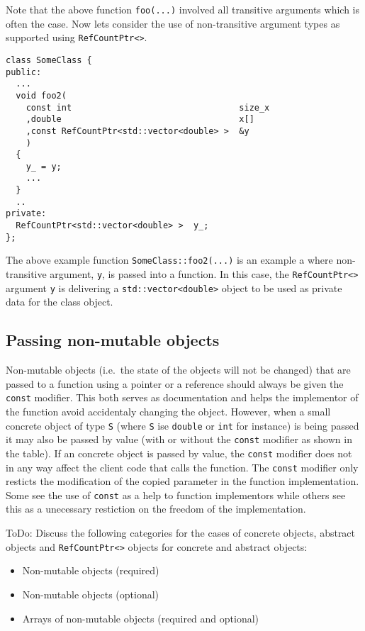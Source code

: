 Note that the above function {}\texttt{foo(...)} involved all
transitive arguments which is often the case.  Now lets consider the
use of non-transitive argument types as supported using
{}\texttt{Ref\-Count\-Ptr<>}.
%
{\scriptsize\begin{verbatim}
class SomeClass {
public:
  ...
  void foo2(
    const int                                 size_x
    ,double                                   x[]
    ,const RefCountPtr<std::vector<double> >  &y
    )
  {
    y_ = y;
    ...
  }
  ..
private:
  RefCountPtr<std::vector<double> >  y_;
};
\end{verbatim}}
%
{}\noindent{}The above example function
{}\texttt{SomeClass\-::foo2(...)} is an example a where non-transitive
argument, {}\texttt{y}, is passed into a function.  In this case, the
{}\texttt{Ref\-Count\-Ptr<>} argument {}\texttt{y} is delivering a
{}\texttt{std\-::vector<\-double>} object to be used as private data
for the class object.

%
\subsection{Passing non-mutable objects}
%

Non-mutable objects (i.e.~the state of the objects will not be
changed) that are passed to a function using a pointer or a reference
should always be given the {}\texttt{const} modifier.  This both
serves as documentation and helps the implementor of the function
avoid accidentaly changing the object.  However, when a small concrete
object of type {}\texttt{S} (where {}\texttt{S} ise {}\texttt{double}
or {}\texttt{int} for instance) is being passed it may also be passed
by value (with or without the {}\texttt{const} modifier as shown in
the table).  If an concrete object is passed by value, the
{}\texttt{const} modifier does not in any way affect the client code
that calls the function.  The {}\texttt{const} modifier only resticts
the modification of the copied parameter in the function
implementation.  Some see the use of {}\texttt{const} as a help to
function implementors while others see this as a unecessary restiction
on the freedom of the implementation.

ToDo: Discuss the following categories for the cases of concrete
objects, abstract objects and {}\texttt{Ref\-Count\-Ptr<>} objects for
concrete and abstract objects:

\begin{itemize}
\item Non-mutable objects (required)
\item Non-mutable objects (optional)
\item Arrays of non-mutable objects (required and optional)
\end{itemize}

